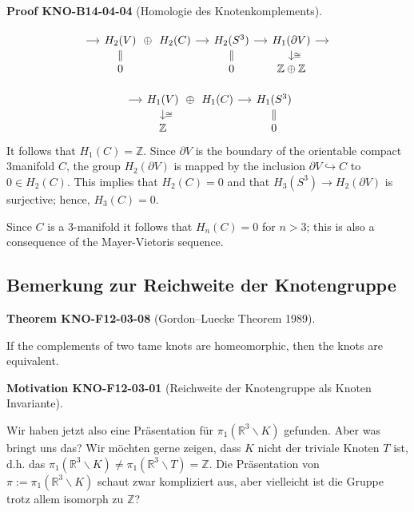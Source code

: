\documentclass[10pt, letterpaper]{article}
\newcommand{\CustomHeading}[3]{%
  \par\medskip\noindent%
  \textbf{#1 #2} \textnormal{(#3)}.\enskip%
}
\newenvironment{THEO}[2]{\CustomHeading{Theorem}{#1}{#2}}{}
\newenvironment{MOT}[2]{\CustomHeading{Motivation}{#1}{#2}}{}
\newenvironment{PROOF}[2]{\CustomHeading{Proof}{#1}{#2}}{}
\begin{document}
\begin{PROOF}{KNO-B14-04-04}{Homologie des Knotenkomplements}
\[
\begin{tikzcd}[row sep=small, column sep=small]
{} \arrow[r]
  & H_2(V) \arrow[r, phantom, "\oplus"] \arrow[d, equal]
  & H_2(C) \arrow[r] 
  & H_2(S^3) \arrow[r] \arrow[d, equal]
  & H_1(\partial V) \arrow[r] \arrow[d, "\cong"]
  & {} \\
{} & 0 & {}& 0 & \mathbb{Z} \oplus \mathbb{Z} & {}
\end{tikzcd}
\]

\[
\begin{tikzcd}[row sep=small, column sep=small]
{} \arrow[r] 
  & H_1(V) \arrow[r, phantom, "\oplus"] \arrow[d, "\cong"] & H_1(C) \arrow[r]
  & H_1(S^3) \arrow[d, equal] \\
{} & \mathbb{Z} & {} & 0
\end{tikzcd}
\]
It follows that $H_{1}(C)=\mathbb{Z}$. Since $\partial V$ is the boundary of the orientable compact 3manifold $C$, the group $H_{2}(\partial V)$ is mapped by the inclusion $\partial V \hookrightarrow C$ to $0 \in H_{2}(C)$. This implies that $H_{2}(C)=0$ and that $H_{3}\left(S^{3}\right) \rightarrow H_{2}(\partial V)$ is surjective; hence, $H_{3}(C)=0$.


Since $C$ is a 3-manifold it follows that $H_{n}(C)=0$ for $n>3$; this is also a consequence of the Mayer-Vietoris sequence.
\end{PROOF}

\subsection{Bemerkung zur Reichweite der Knotengruppe}

\begin{THEO}{KNO-F12-03-08}{Gordon–Luecke Theorem 1989}
If the complements of two tame knots are homeomorphic, then the knots are equivalent.
\end{THEO}

\begin{MOT}{KNO-F12-03-01}{Reichweite der Knotengruppe als Knoten Invariante}
Wir haben jetzt also eine Präsentation für $\pi_1\left(\mathbb{R}^3 \backslash K\right)$ gefunden. Aber was bringt uns das? Wir möchten gerne zeigen, dass $K$ nicht der triviale Knoten $T$ ist, d.h. das $\pi_1\left(\mathbb{R}^3 \backslash K\right) \neq \pi_1\left(\mathbb{R}^3 \backslash T\right)=\mathbb{Z}$. Die Präsentation von $\pi:=\pi_1\left(\mathbb{R}^3 \backslash K\right)$ schaut zwar kompliziert aus, aber vielleicht ist die Gruppe trotz allem isomorph zu $\mathbb{Z}$?
\end{MOT}
\end{document}
